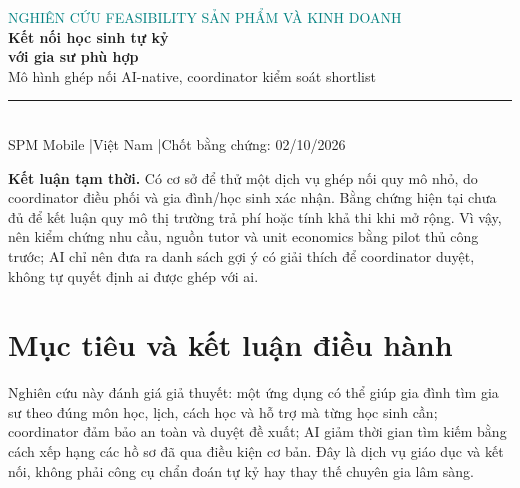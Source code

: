 \documentclass[11pt,a4paper]{article}
\begin{document}
\begin{center}
{\large\textcolor{teal}{NGHIÊN CỨU FEASIBILITY SẢN PHẨM VÀ KINH DOANH}}\\[7pt]
{\LARGE\bfseries\color{ink} Kết nối học sinh tự kỷ\\ với gia sư phù hợp}\\[7pt]
{\large Mô hình ghép nối AI-native, coordinator kiểm soát shortlist}\\[12pt]
\rule{0.82\textwidth}{0.7pt}\\[7pt]
\textcolor{muted}{SPM Mobile \quad|\quad Việt Nam \quad|\quad Chốt bằng chứng: 02/10/2026}
\end{center}

\vspace{5pt}
\noindent
\colorbox{sky}{\parbox{\dimexpr\textwidth-2\fboxsep\relax}{
\textbf{\textcolor{ink}{Kết luận tạm thời.}}
Có cơ sở để thử một dịch vụ ghép nối quy mô nhỏ, do coordinator điều phối và
gia đình/học sinh xác nhận. Bằng chứng hiện tại chưa đủ để kết luận quy mô thị
trường trả phí hoặc tính khả thi khi mở rộng. Vì vậy, nên kiểm chứng nhu cầu,
nguồn tutor và unit economics bằng pilot thủ công trước; AI chỉ nên đưa ra danh
sách gợi ý có giải thích để coordinator duyệt, không tự quyết định ai được ghép
với ai.
}}

\newpage
\tableofcontents
\newpage

\section{Mục tiêu và kết luận điều hành}

Nghiên cứu này đánh giá giả thuyết: một ứng dụng có thể giúp gia đình tìm gia
sư theo đúng môn học, lịch, cách học và hỗ trợ mà từng học sinh cần; coordinator
đảm bảo an toàn và duyệt đề xuất; AI giảm thời gian tìm kiếm bằng cách xếp hạng
các hồ sơ đã qua điều kiện cơ bản. Đây là dịch vụ giáo dục và kết nối, không
phải công cụ chẩn đoán tự kỷ hay thay thế chuyên gia lâm sàng.
\end{document}
